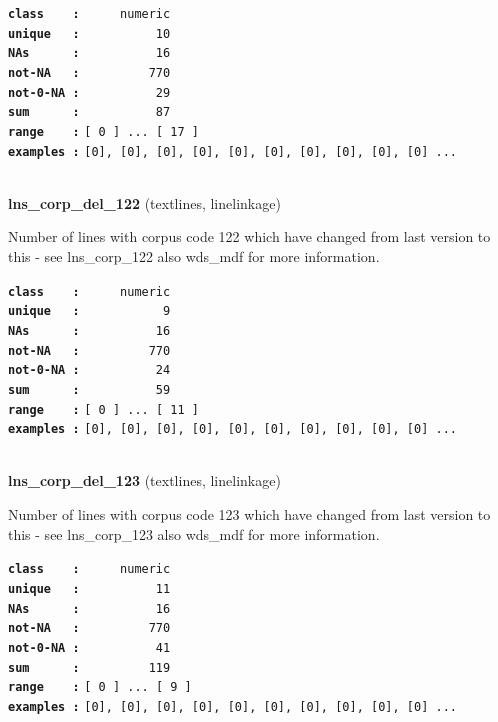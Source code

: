 \documentclass[]{article}
\begin{document}
\textbf{\texttt{class\ \ \ \ :}} \texttt{~~~~~numeric}\\
\textbf{\texttt{unique\ \ \ :}} \texttt{~~~~~~~~~~10}\\
\textbf{\texttt{NAs\ \ \ \ \ \ :}} \texttt{~~~~~~~~~~16}\\
\textbf{\texttt{not-NA\ \ \ :}} \texttt{~~~~~~~~~770}\\
\textbf{\texttt{not-0-NA\ :}} \texttt{~~~~~~~~~~29}\\
\textbf{\texttt{sum\ \ \ \ \ \ :}} \texttt{~~~~~~~~~~87}\\
\textbf{\texttt{range\ \ \ \ :}}
\texttt{{[}\ 0\ {]}\ ...\ {[}\ 17\ {]}}\\
\textbf{\texttt{examples\ :}}
\texttt{{[}0{]},\ {[}0{]},\ {[}0{]},\ {[}0{]},\ {[}0{]},\ {[}0{]},\ {[}0{]},\ {[}0{]},\ {[}0{]},\ {[}0{]}\ ...}\\

~

\textbf{lns\_corp\_del\_122} (textlines, linelinkage)

Number of lines with corpus code 122 which have changed from last
version to this - see lns\_corp\_122 also wds\_mdf for more information.

\textbf{\texttt{class\ \ \ \ :}} \texttt{~~~~~numeric}\\
\textbf{\texttt{unique\ \ \ :}} \texttt{~~~~~~~~~~~9}\\
\textbf{\texttt{NAs\ \ \ \ \ \ :}} \texttt{~~~~~~~~~~16}\\
\textbf{\texttt{not-NA\ \ \ :}} \texttt{~~~~~~~~~770}\\
\textbf{\texttt{not-0-NA\ :}} \texttt{~~~~~~~~~~24}\\
\textbf{\texttt{sum\ \ \ \ \ \ :}} \texttt{~~~~~~~~~~59}\\
\textbf{\texttt{range\ \ \ \ :}}
\texttt{{[}\ 0\ {]}\ ...\ {[}\ 11\ {]}}\\
\textbf{\texttt{examples\ :}}
\texttt{{[}0{]},\ {[}0{]},\ {[}0{]},\ {[}0{]},\ {[}0{]},\ {[}0{]},\ {[}0{]},\ {[}0{]},\ {[}0{]},\ {[}0{]}\ ...}\\

~

\textbf{lns\_corp\_del\_123} (textlines, linelinkage)

Number of lines with corpus code 123 which have changed from last
version to this - see lns\_corp\_123 also wds\_mdf for more information.

\textbf{\texttt{class\ \ \ \ :}} \texttt{~~~~~numeric}\\
\textbf{\texttt{unique\ \ \ :}} \texttt{~~~~~~~~~~11}\\
\textbf{\texttt{NAs\ \ \ \ \ \ :}} \texttt{~~~~~~~~~~16}\\
\textbf{\texttt{not-NA\ \ \ :}} \texttt{~~~~~~~~~770}\\
\textbf{\texttt{not-0-NA\ :}} \texttt{~~~~~~~~~~41}\\
\textbf{\texttt{sum\ \ \ \ \ \ :}} \texttt{~~~~~~~~~119}\\
\textbf{\texttt{range\ \ \ \ :}}
\texttt{{[}\ 0\ {]}\ ...\ {[}\ 9\ {]}}\\
\textbf{\texttt{examples\ :}}
\texttt{{[}0{]},\ {[}0{]},\ {[}0{]},\ {[}0{]},\ {[}0{]},\ {[}0{]},\ {[}0{]},\ {[}0{]},\ {[}0{]},\ {[}0{]}\ ...}\\
\end{document}
